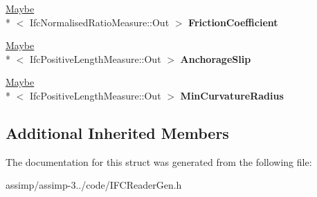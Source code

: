 \begin{DoxyCompactItemize}
\item 
\hypertarget{struct_assimp_1_1_i_f_c_1_1_ifc_tendon_a877fa2c94d2a7df1db71af722f5458a8}{\hyperlink{struct_assimp_1_1_s_t_e_p_1_1_maybe}{Maybe}\\*
$<$ Ifc\+Normalised\+Ratio\+Measure\+::\+Out $>$ {\bfseries Friction\+Coefficient}}\label{struct_assimp_1_1_i_f_c_1_1_ifc_tendon_a877fa2c94d2a7df1db71af722f5458a8}

\item 
\hypertarget{struct_assimp_1_1_i_f_c_1_1_ifc_tendon_a5fead90237639b16d8741485f06fa3b4}{\hyperlink{struct_assimp_1_1_s_t_e_p_1_1_maybe}{Maybe}\\*
$<$ Ifc\+Positive\+Length\+Measure\+::\+Out $>$ {\bfseries Anchorage\+Slip}}\label{struct_assimp_1_1_i_f_c_1_1_ifc_tendon_a5fead90237639b16d8741485f06fa3b4}

\item 
\hypertarget{struct_assimp_1_1_i_f_c_1_1_ifc_tendon_a3851d071e0548055c3e8663441f03b64}{\hyperlink{struct_assimp_1_1_s_t_e_p_1_1_maybe}{Maybe}\\*
$<$ Ifc\+Positive\+Length\+Measure\+::\+Out $>$ {\bfseries Min\+Curvature\+Radius}}\label{struct_assimp_1_1_i_f_c_1_1_ifc_tendon_a3851d071e0548055c3e8663441f03b64}

\end{DoxyCompactItemize}
\subsection*{Additional Inherited Members}


The documentation for this struct was generated from the following file\+:\begin{DoxyCompactItemize}
\item 
assimp/assimp-\/3../code/I\+F\+C\+Reader\+Gen.\+h\end{DoxyCompactItemize}
